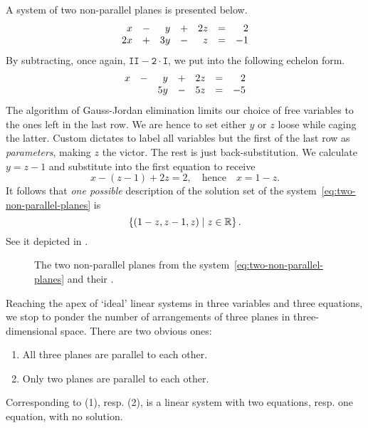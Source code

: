 A system of two non-parallel planes is presented below.
\begin{equation}
 \label{eq:two-non-parallel-planes}
 \begin{array}{r c r c r c r}
  x & - & y & + & 2z & = & 2\\
  2x & + & 3y & - & z & = & -1
 \end{array}
\end{equation}
By subtracting, once again, $\mathtt{II - 2 \cdot I}$, we put into the following
echelon form.
\[
 \begin{array}{r c r c r c r}
  x & - & y & + & 2z & = & 2\\
    &   & 5y & - & 5z & = & -5
 \end{array}
\]
The algorithm of Gauss-Jordan elimination limits our choice of free variables to
the ones left in the last row. We are hence to set either $y$ or $z$ loose while
caging the latter. Custom dictates to label all variables but the first of the
last row as \emph{parameters}, making $z$ the victor. The rest is just
back-substitution. We calculate $y = z - 1$ and substitute into the first
equation to receive
\[
 x - (z - 1) + 2z = 2, \quad \text{hence} \quad x = 1 - z.
\]
It follows that \emph{one possible} description of the solution set of the
system~\eqref{eq:two-non-parallel-planes} is
\[
 \left\{ (1 - z, z - 1, z) \mid z \in \mathbb{R}\right\}.
\]
See it depicted in .
\begin{figure}[ht]
 \centering

 \caption{The two non-parallel planes from the
 system~\eqref{eq:two-non-parallel-planes} and their .}
 \label{fig:two-non-parallel-planes}
\end{figure}

Reaching the apex of `ideal' linear systems in three variables and three
equations, we stop to ponder the number of arrangements of three planes in
three-dimensional space. There are two obvious ones:
\begin{enumerate}
 \item All three planes are parallel to each other.
 \item Only two planes are parallel to each other.
\end{enumerate}
Corresponding to (1), resp. (2), is a linear system with two equations, resp.
one equation, with no solution.

